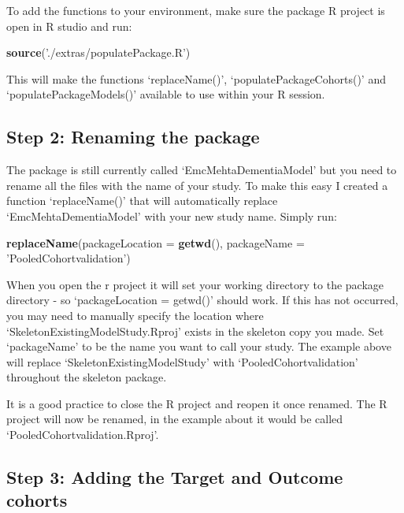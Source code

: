 \documentclass[
]{article}
\newenvironment{Shaded}{\begin{snugshade}}{\end{snugshade}}
\newcommand{\DataTypeTok}[1]{\textcolor[rgb]{0.13,0.29,0.53}{#1}}
\newcommand{\KeywordTok}[1]{\textcolor[rgb]{0.13,0.29,0.53}{\textbf{#1}}}
\newcommand{\NormalTok}[1]{#1}
\newcommand{\StringTok}[1]{\textcolor[rgb]{0.31,0.60,0.02}{#1}}
\begin{document}
To add the functions to your environment, make sure the package R
project is open in R studio and run:

\begin{Shaded}
\begin{Highlighting}[]
\KeywordTok{source}\NormalTok{(}\StringTok{'./extras/populatePackage.R'}\NormalTok{)}
\end{Highlighting}
\end{Shaded}

This will make the functions `replaceName()', `populatePackageCohorts()'
and `populatePackageModels()' available to use within your R session.

\hypertarget{step-2-renaming-the-package}{%
\subsection{Step 2: Renaming the
package}\label{step-2-renaming-the-package}}

The package is still currently called
`EmcMehtaDementiaModel' but you need to rename all the
files with the name of your study. To make this easy I created a
function `replaceName()' that will automatically replace
`EmcMehtaDementiaModel' with your new study name. Simply
run:

\begin{Shaded}
\begin{Highlighting}[]
\KeywordTok{replaceName}\NormalTok{(}\DataTypeTok{packageLocation =} \KeywordTok{getwd}\NormalTok{(), }
          \DataTypeTok{packageName =} \StringTok{'PooledCohortvalidation'}\NormalTok{)}
\end{Highlighting}
\end{Shaded}

When you open the r project it will set your working directory to the
package directory - so `packageLocation = getwd()' should work. If this
has not occurred, you may need to manually specify the location where
`SkeletonExistingModelStudy.Rproj' exists in the skeleton copy you made.
Set `packageName' to be the name you want to call your study. The
example above will replace `SkeletonExistingModelStudy' with
`PooledCohortvalidation' throughout the skeleton package.

It is a good practice to close the R project and reopen it once renamed.
The R project will now be renamed, in the example about it would be
called `PooledCohortvalidation.Rproj'.

\hypertarget{step-3-adding-the-target-and-outcome-cohorts}{%
\subsection{Step 3: Adding the Target and Outcome
cohorts}\label{step-3-adding-the-target-and-outcome-cohorts}}
\end{document}
